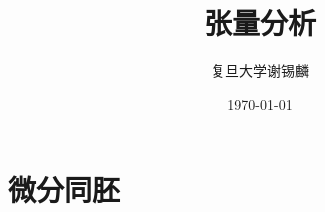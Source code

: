 \documentclass[oneside]{book}
\title{
	\vspace{-4 cm} \color{Sienna} \Huge 张量分析
}
\author{
	\CJKfamily{楷体} \color{DarkRed} \Large 复旦大学\phantom{空格}谢锡麟
}
\date{
	\CJKfamily{楷体} \color{Goldenrod} \Large \today
}
\theoremstyle{nonumberplain} %
\begin{document}
%	
%	
%		
%	
%		
%	
	\chapter{微分同胚}
		
%		
\end{document}
